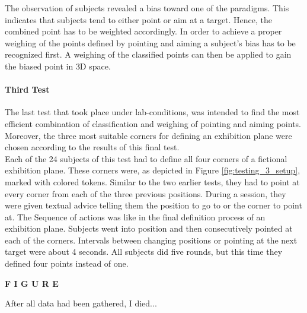 The observation of subjects revealed a bias toward one of the paradigms. This indicates that subjects tend to either point or aim at a target. Hence, the combined point has to be weighted accordingly. In order to achieve a proper weighing of the points defined by pointing and aiming a subject's bias has to be recognized first. A weighing of the classified points can then be applied to gain the biased point in \ac{3D} space. 

\paragraph{Third Test} The last test that took place under lab-conditions, was intended to find the most efficient combination of classification and weighing of pointing and aiming points. Moreover, the three most suitable corners for defining an exhibition plane were chosen according to the results of this final test.
\\
Each of the 24 subjects of this test had to define all four corners of a fictional exhibition plane. These corners were, as depicted in Figure \ref{fig:testing_3_setup}, marked with colored tokens. Similar to the two earlier tests, they had to point at every corner from each of the three previous positions. During a session, they were given textual advice telling them the position to go to or the corner to point at. The Sequence of actions was like in the final definition process of an exhibition plane. Subjects went into position and then consecutively pointed at each of the corners. Intervals between changing positions or pointing at the next target were about 4 seconds. All subjects did five rounds, but this time they defined four points instead of one.

\textbf{F I G U R E}

After all data had been gathered, I died...

